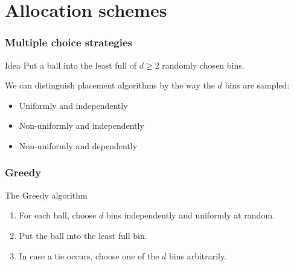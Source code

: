 \documentclass[serif,professionalfonts]{beamer}
\newcommand\scalefac{0.55}
\newcommand\ballsize{5mm}
\newcommand\nrbins{6}
\newcommand\padding{0.1*\ballsize}
\newcommand\bingap{1.6*\balldiameter}
\newcommand\balldiameter{2*\ballsize}
\newcommand\iA[2][0]{
	\path (\nbid) edge[insert, bend left=#1] (#2);
}
\newcommand\bin[1]{
	\path node[topflat, xshift=#1*\bingap*\scalefac, above, yshift=-\padding*\scalefac]  {};
}
\newcommand\bins{
	\foreach \ibin in {1,...,\nrbins}
		\bin{\ibin};
}
\newcommand\setNode[2]{
	\draw let \n1 ={#1#2} in node[circle, minimum size = \ballsize](n\n1) at (#1*\bingap,#2*\balldiameter-\ballsize) {};
}
\newcommand\nodes{
	\foreach \i in {1,...,6}
		\foreach \j in {1,...,5}
			\setNode{\i}{\j};
}
\newcommand\ball[2]{
	\shade[ballstyle] (#1*\bingap,#2*\balldiameter-\ballsize) circle (\ballsize) {};
}
\newcommand\nbid{nb}
\newcommand\newball{
	\draw node[circle, minimum size = \ballsize](\nbid) at (0*\bingap,6*\balldiameter-\ballsize) {};
	\ball{0}{6};
}
\newcommand\putinbin[2]{
	\ifnum #2 > 0
		\foreach \nrballs in {1,...,#2}
 			\ball{#1}{\nrballs};
 	\fi
}
\newcounter{index}
\newcommand\balls[1]{%
	\getargsC{#1}%
  	\setcounter{index}{0}%
  	\whiledo{\theindex < \narg}{%
    		\stepcounter{index}%
    		\putinbin{\theindex}{\csname arg\romannumeral\theindex\endcsname}%
  	}%
}
\newcommand\bab[1]{%
	\bins
	\nodes
	\balls{#1}
}
\begin{document}
\section{Allocation schemes}
\begin{frame}
\frametitle{Multiple choice strategies}

\begin{exampleblock}{Idea}
Put a ball into the \alert{least full} of $d\geq2$ randomly chosen bins.
\end{exampleblock}

\pause
\bigskip
We can distinguish placement algorithms by the way the $d$ \alert{bins are sampled}:
\begin{itemize}
\item Uniformly and independently
\item Non-uniformly and independently
\item Non-uniformly and dependently
\end{itemize}
\end{frame}

\begin{frame}
\frametitle{Greedy}
\begin{exampleblock}{The Greedy algorithm}
\begin{enumerate}
\item For each ball, choose $d$ bins independently and uniformly at random. 
\item Put the ball into the least full bin.
\item In case a tie occurs, choose one of the $d$ bins arbitrarily.
\end{enumerate}
\end{exampleblock}

\begin{center}
\end{center}

\end{frame}
\end{document}
